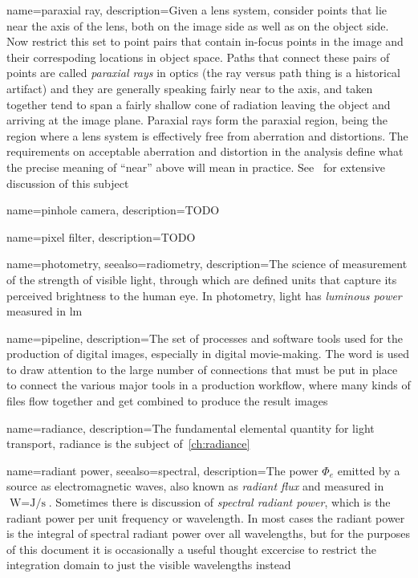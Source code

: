 {
	name={paraxial ray},
	description={Given a lens system, consider points that lie near the axis of the lens,
		both on the image side as well as on the object side. 
		Now restrict this set to point pairs that contain in-focus points in the image and their
		correspoding locations in object space.
		Paths that connect these pairs of points are called \textsl{paraxial rays} in optics
		(the ray versus path thing is a historical artifact) and they are generally speaking
		fairly near to the axis, and taken together tend to span a fairly shallow cone of 
		radiation leaving the object and arriving at the image plane.
		Paraxial rays form the paraxial region, being the region where a lens system is
		effectively free from aberration and distortions.
		The requirements on acceptable aberration and distortion in the analysis define what
		the precise meaning of ``near'' above will mean in practice.
		See~\cite{kingslake2010} for extensive discussion of this subject}
}

{
	name={pinhole camera},
	description={TODO}
}

{
	name={pixel filter},
	description={TODO}
}

{
	name={photometry},
	seealso={radiometry},
	description={The science of measurement of the strength of visible light, 
		through which are defined units that capture its perceived brightness 
		to the human eye. In photometry, light has \textsl{luminous power} 
		measured in \unit{\lumen}}
}


{
	name={pipeline},
	description={The set of processes and software tools used for the production of 
		digital images, especially in digital movie-making. The word is used to draw
		attention to the large number of connections that must be put in place to 
		connect the various major tools in a production workflow, where many kinds
		of files flow together and get combined to produce the result images}
}

{
	name=radiance,
	description={The fundamental elemental quantity for light transport, radiance
		is the subject of~\cref{ch:radiance}}
}

{
	name={radiant power},
	seealso={spectral},
	description={The power $\Phi_e$ emitted by a source as electromagnetic waves,
		also known as \textsl{radiant flux} and measured in 
		$\unit{\watt} = \unit{\joule\per\second}$. 
		Sometimes there is discussion of \textsl{spectral radiant power},
		which is the radiant power per unit frequency or wavelength.
		In most cases the radiant power is the integral of spectral radiant power
		over all wavelengths, but for the purposes of this document it is occasionally 
		a useful thought excercise to restrict the integration domain to just the
		visible wavelengths instead}
}


